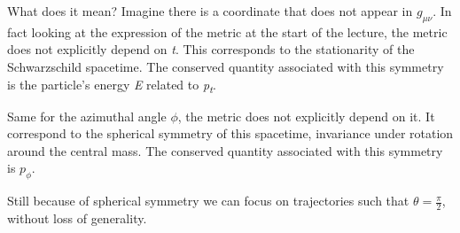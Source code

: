 What does it mean? Imagine there is a coordinate that does not appear in $g_{\mu \nu }$.
In fact looking at the expression of the metric at the start of the lecture, the metric does not explicitly depend on \emph{t}. This corresponds to the stationarity of the Schwarzschild spacetime. The conserved quantity associated with this symmetry is the particle's energy \emph{E} related to \emph{p\textsubscript{t}}.\par
Same for the azimuthal angle $\phi $, the metric does not explicitly depend on it. It correspond to the spherical symmetry of this spacetime, invariance under rotation around the central mass. The conserved quantity associated with this symmetry is $p_{\phi }$.\par
Still because of spherical symmetry we can focus on trajectories such that $\theta  = \frac{\pi }{2}$, without loss of generality.


